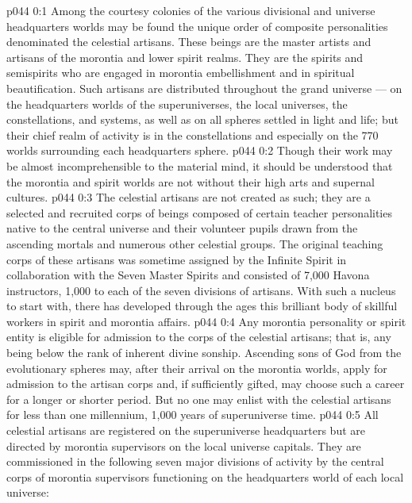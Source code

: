\author{Archangel}
\vs p044 0:1 Among the courtesy colonies of the various divisional and universe headquarters worlds may be found the unique order of composite personalities denominated the celestial artisans. These beings are the master artists and artisans of the morontia and lower spirit realms. They are the spirits and semispirits who are engaged in morontia embellishment and in spiritual beautification. Such artisans are distributed throughout the grand universe --- on the headquarters worlds of the superuniverses, the local universes, the constellations, and systems, as well as on all spheres settled in light and life; but their chief realm of activity is in the constellations and especially on the 770 worlds surrounding each headquarters sphere.
\vs p044 0:2 Though their work may be almost incomprehensible to the material mind, it should be understood that the morontia and spirit worlds are not without their high arts and supernal cultures.
\vs p044 0:3 \pc The celestial artisans are not created as such; they are a selected and recruited corps of beings composed of certain teacher personalities native to the central universe and their volunteer pupils drawn from the ascending mortals and numerous other celestial groups. The original teaching corps of these artisans was sometime assigned by the Infinite Spirit in collaboration with the Seven Master Spirits and consisted of 7,000 Havona instructors, 1,000 to each of the seven divisions of artisans. With such a nucleus to start with, there has developed through the ages this brilliant body of skillful workers in spirit and morontia affairs.
\vs p044 0:4 Any morontia personality or spirit entity is eligible for admission to the corps of the celestial artisans; that is, any being below the rank of inherent divine sonship. Ascending sons of God from the evolutionary spheres may, after their arrival on the morontia worlds, apply for admission to the artisan corps and, if sufficiently gifted, may choose such a career for a longer or shorter period. But no one may enlist with the celestial artisans for less than one millennium, 1,000 years of superuniverse time.
\vs p044 0:5 All celestial artisans are registered on the superuniverse headquarters but are directed by morontia supervisors on the local universe capitals. They are commissioned in the following seven major divisions of activity by the central corps of morontia supervisors functioning on the headquarters world of each local universe:
